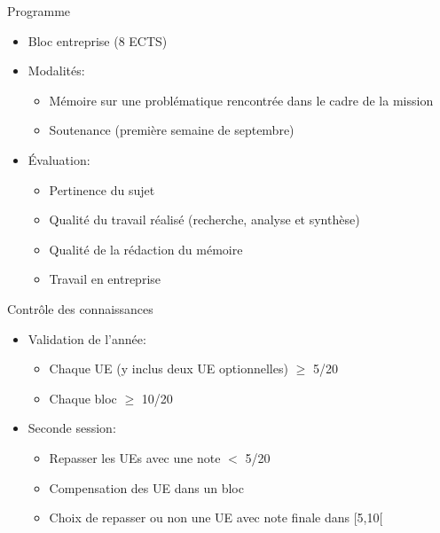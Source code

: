 \documentclass[minimal,compress]{beamer}
\begin{document}
\begin{frame}{Programme}

\begin{itemize}
\item \alert{Bloc entreprise} (8 ECTS)
\end{itemize}

\begin{itemize}
\item Modalités:
\begin{itemize}
\item Mémoire sur une problématique rencontrée dans le cadre de la mission
\item Soutenance (première semaine de septembre)
\end{itemize}
\item Évaluation:
\begin{itemize}
\item Pertinence du sujet
\item Qualité du travail réalisé (recherche, analyse et synthèse)
\item Qualité de la rédaction du mémoire
\item Travail en entreprise
\end{itemize}

\end{itemize}

\end{frame}


\begin{frame}{Contrôle des connaissances}
\begin{itemize}
\item Validation de l’année:
\begin{itemize}
\item \alert{Chaque UE} (y inclus deux UE optionnelles) $\geq$ \alert{5}/20
\item \alert{Chaque bloc} $\geq$ \alert{10}/20
\end{itemize}
\item Seconde session:
\begin{itemize}
\item Repasser les UEs avec une note $<$ \alert{5/20}
\item Compensation des UE dans un bloc
\item Choix de repasser ou non une UE avec note finale dans [5,10[
\end{itemize}
\end{itemize}
\end{frame}
\end{document}
